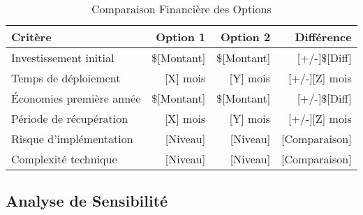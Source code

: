 \begin{table}[H]
\centering
\caption{Comparaison Financière des Options}
\label{tab:comparison}
\begin{tabular}{|p{}|r|r|r|}
\hline
\rowcolor{DollaramaGreen!30}
\textbf{\color{white}Critère} & 
\textbf{\color{white}Option 1} & 
\textbf{\color{white}Option 2} & 
\textbf{\color{white}Différence} \\
\hline
Investissement initial & \$[Montant] & \$[Montant] & \textcolor{DollaramaGreen}{[+/-]\$[Diff]} \\
\hline
\rowcolor{gray!10}
Temps de déploiement & [X] mois & [Y] mois & \textcolor{DollaramaGreen}{[+/-][Z] mois} \\
\hline
Économies première année & \$[Montant] & \$[Montant] & \textcolor{DollaramaGreen}{[+/-]\$[Diff]} \\
\hline
\rowcolor{gray!10}
Période de récupération & [X] mois & [Y] mois & \textcolor{DollaramaGreen}{[+/-][Z] mois} \\
\hline
Risque d'implémentation & [Niveau] & [Niveau] & \textcolor{DollaramaGreen}{[Comparaison]} \\
\hline
\rowcolor{gray!10}
Complexité technique & [Niveau] & [Niveau] & \textcolor{DollaramaGreen}{[Comparaison]} \\
\hline
\end{tabular}
\end{table}

\subsection{Analyse de Sensibilité}


